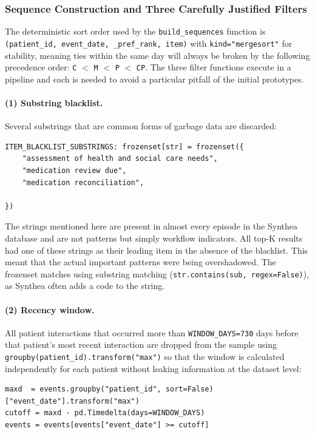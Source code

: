 \subsubsection*{Sequence Construction and Three Carefully Justified Filters}

The deterministic sort order used by the \texttt{build\_sequences} function is \texttt{(patient\_id, event\_date, \_pref\_rank, item)} with \texttt{kind="mergesort"} for stability, meaning ties within the same day will always be broken by the following precedence order: \texttt{C} \(<\) \texttt{M} \(<\) \texttt{P} \(<\) \texttt{CP}. The three filter functions execute in a pipeline and each is needed to avoid a particular pitfall of the initial prototypes.

\paragraph{(1) Substring blacklist.} Several substrings that are common forms of garbage data are discarded:

\begin{lstlisting}[style=pythonstyle]
ITEM_BLACKLIST_SUBSTRINGS: frozenset[str] = frozenset({
    "assessment of health and social care needs",
    "medication review due",
    "medication reconciliation",

})
\end{lstlisting}

\noindent The strings mentioned here are present in almost every episode in the Synthea database and are not patterns but simply workflow indicators. All top-K results had one of these strings as their leading item in the absence of the blacklist. This meant that the actual important patterns were being overshadowed. The frozenset matches using substring matching (\texttt{str.contains(sub, regex=False)}), as Synthea often adds a code to the string.

\paragraph{(2) Recency window.} All patient interactions that occurred more than \texttt{WINDOW\_DAYS=730} days before that patient's most recent interaction are dropped from the sample using \texttt{groupby(patient\_id).transform("max")} so that the window is calculated independently for each patient without leaking information at the dataset level:

\begin{lstlisting}[style=pythonstyle]
maxd  = events.groupby("patient_id", sort=False)["event_date"].transform("max")
cutoff = maxd - pd.Timedelta(days=WINDOW_DAYS)
events = events[events["event_date"] >= cutoff]
\end{lstlisting}

